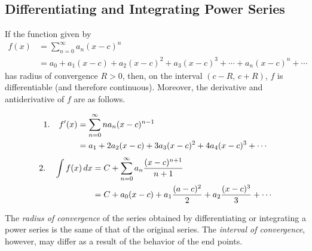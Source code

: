 \documentclass[addpoints, 12pt]{exam}
\begin{document}
\newpage


\subsection*{Differentiating and Integrating Power Series}
\begin{tcolorbox}[title= PROPERTIES OF FUNCTIONS DEFINED BY POWER SERIES,black,sharp corners,colback=white,colbacktitle=white,coltitle=black]

    If the function given by
    \begin{align*}
        f(x) &= \sum_{n=0}^{\infty}a_n (x-c)^n\\
        &= a_0 + a_1 (x-c)+a_2 (x-c)^2+a_3 (x-c)^3+\cdots+a_n (x-c)^n+\cdots
    \end{align*}
    has radius of convergence $R>0$, then, on the interval $(c-R,\,c+R)$, $f$ is differentiable (and therefore continuous). Moreover, the derivative and antiderivative of $f$ are as follows.
    
    
        \begin{align*}
            1.\hspace{.15in} f'(x) &= \sum_{n=0}^{\infty}na_n (x-c)^{n-1}\\
        &= a_1 + 2a_2 (x-c)+3a_3 (x-c)^2+4a_4 (x-c)^3+\cdots
        \end{align*}
        \begin{align*}
            2.\hspace{.15in}\int f(x)\,dx &= C+\sum_{n=0}^{\infty} a_n\frac{(x-c)^{n+1}}{n+1}\\
            &= C + a_0 (x-c)+ a_1\frac{(a-c)^2}{2}+a_2\frac{(x-c)^3}{3}+\cdots
        \end{align*}
    
    The \textit{radius of convergence} of the series obtained by differentiating or integrating a power series is the same of that of the original series. The \textit{interval of convergence}, however, may differ as a result of the behavior of the end points.
    
\end{tcolorbox}
\vspace{.1cm}
\end{document}
